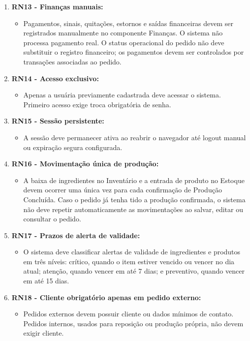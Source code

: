 \begin{enumerate}
    \item \textbf{RN13 -  Finanças manuais:}
    \begin{itemize}
        \item Pagamentos, sinais, quitações, estornos e saídas financeiras devem ser registrados manualmente no componente Finanças. O sistema não processa pagamento real. O status operacional do pedido não deve substituir o registro financeiro; os pagamentos devem ser controlados por transações associadas ao pedido.
    \end{itemize}

    \item \textbf{RN14 -  Acesso exclusivo:}
    \begin{itemize}
        \item Apenas a usuária previamente cadastrada deve acessar o sistema. Primeiro acesso exige troca obrigatória de senha. 
    \end{itemize}

    \item \textbf{RN15 -  Sessão persistente:}
    \begin{itemize}
        \item A sessão deve permanecer ativa ao reabrir o navegador até logout manual ou expiração segura configurada. 
    \end{itemize}

    \item \textbf{RN16 -  Movimentação única de produção:}
    \begin{itemize}
        \item A baixa de ingredientes no Inventário e a entrada de produto no Estoque devem ocorrer uma única vez para cada confirmação de Produção Concluída. Caso o pedido já tenha tido a produção confirmada, o sistema não deve repetir automaticamente as movimentações ao salvar, editar ou consultar o pedido. 
    \end{itemize}

    \item \textbf{RN17 -  Prazos de alerta de validade:}
    \begin{itemize}
        \item O sistema deve classificar alertas de validade de ingredientes e produtos em três níveis: crítico, quando o item estiver vencido ou vencer no dia atual; atenção, quando vencer em até 7 dias; e preventivo, quando vencer em até 15 dias. 
    \end{itemize}

    \item \textbf{RN18 -  Cliente obrigatório apenas em pedido externo:}
    \begin{itemize}
        \item Pedidos externos devem possuir cliente ou dados mínimos de contato. Pedidos internos, usados para reposição ou produção própria, não devem exigir cliente. 
    \end{itemize}

\end{enumerate}

